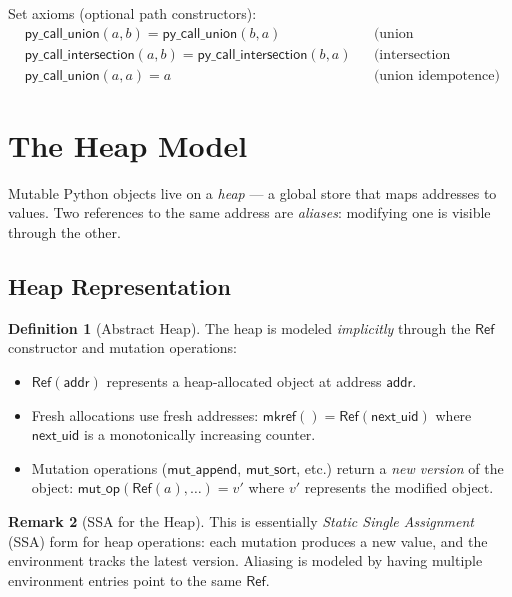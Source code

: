 \documentclass[11pt,a4paper]{report}
\theoremstyle{definition}
\newtheorem{definition}{Definition}[chapter]
\newtheorem{remark}[definition]{Remark}
\theoremstyle{plain}
\begin{document}
Set axioms (optional path constructors):
\begin{align}
  &\mathsf{py\_call\_union}(a, b) = \mathsf{py\_call\_union}(b, a)
    && \text{(union commutativity)} \\
  &\mathsf{py\_call\_intersection}(a, b) =
    \mathsf{py\_call\_intersection}(b, a)
    && \text{(intersection commutativity)} \\
  &\mathsf{py\_call\_union}(a, a) = a
    && \text{(union idempotence)}
\end{align}


\section{The Heap Model}

Mutable Python objects live on a \emph{heap} --- a global store that
maps addresses to values.  Two references to the same address are
\emph{aliases}: modifying one is visible through the other.

\subsection{Heap Representation}

\begin{definition}[Abstract Heap]
The heap is modeled \emph{implicitly} through the $\mathsf{Ref}$
constructor and mutation operations:
\begin{itemize}
  \item $\mathsf{Ref}(\mathsf{addr})$ represents a heap-allocated
    object at address $\mathsf{addr}$.
  \item Fresh allocations use fresh addresses:
    $\mathsf{mkref}() = \mathsf{Ref}(\mathsf{next\_uid})$
    where $\mathsf{next\_uid}$ is a monotonically increasing counter.
  \item Mutation operations ($\mathsf{mut\_append}$,
    $\mathsf{mut\_sort}$, etc.) return a \emph{new version} of the
    object: $\mathsf{mut\_op}(\mathsf{Ref}(a), \ldots) = v'$
    where $v'$ represents the modified object.
\end{itemize}
\end{definition}

\begin{remark}[SSA for the Heap]
This is essentially \emph{Static Single Assignment} (SSA) form for
heap operations: each mutation produces a new value, and the
environment tracks the latest version.  Aliasing is modeled by
having multiple environment entries point to the same $\mathsf{Ref}$.
\end{remark}
\end{document}
